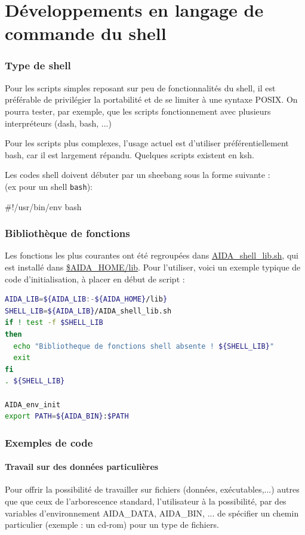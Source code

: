 \part{Développements en langage de commande du shell}
\label{part:dev_sh}

\section{Type de shell}
   Pour les scripts simples reposant sur peu de fonctionnalités
du shell, il est préférable de privilégier la portabilité et de
se limiter à une syntaxe POSIX. On pourra tester, par exemple,
que les scripts fonctionnement avec plusieurs interpréteurs (dash, bash, ...)

   Pour les scripts plus complexes, l'usage actuel est d'utiliser préférentiellement
bash, car il est largement répandu. Quelques scripts existent en ksh.

\smallbreak
  Les codes shell doivent débuter par un sheebang sous la forme suivante : \\
 (ex pour un shell \texttt{bash}): 
\begin{boxedverbatim}
#!/usr/bin/env  bash
\end{boxedverbatim}

\section{Bibliothèque de fonctions}
   Les fonctions les plus courantes ont été regroupées dans \url{AIDA_shell_lib.sh}, 
qui est installé dans  \url{$AIDA_HOME/lib}. 
   Pour l'utiliser, voici un exemple typique de code d'initialisation, à placer
en début de script : 

\begin{lstlisting}[language=sh,frame=trbl,basicstyle=\small\ttfamily]
AIDA_LIB=${AIDA_LIB:-${AIDA_HOME}/lib}
SHELL_LIB=${AIDA_LIB}/AIDA_shell_lib.sh
if ! test -f $SHELL_LIB
then
  echo "Bibliotheque de fonctions shell absente ! ${SHELL_LIB}"
  exit
fi
. ${SHELL_LIB}

AIDA_env_init
export PATH=${AIDA_BIN}:$PATH
\end{lstlisting}

\section{Exemples de code}
\subsection{Travail sur des données particulières}
  Pour offrir la possibilité de travailler sur fichiers (données, exécutables,...) autres
que que ceux de l'arborescence standard, l'utilisateur à la possibilité, par des
variables d'environnement AIDA\_DATA, AIDA\_BIN, ... de spécifier un chemin
particulier (exemple : un cd-rom) pour un type de fichiers.

